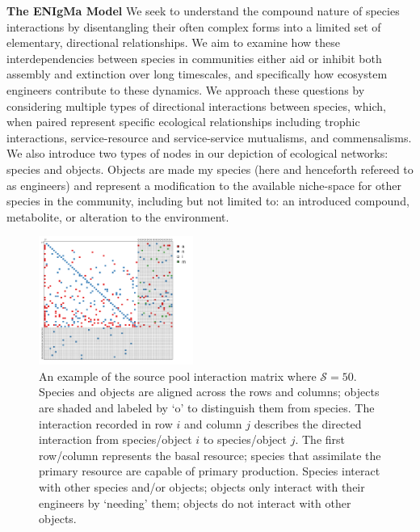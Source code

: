 \documentclass[twocolumn,preprintnumbers,amsmath,amssymb,superscriptaddress]{revtex4}
\begin{document}
\textbf{The ENIgMa Model} We seek to understand the compound nature of species interactions by disentangling their often complex forms into a limited set of elementary, directional relationships.
We aim to examine how these interdependencies between species in communities either aid or inhibit both assembly and extinction over long timescales, and specifically how ecosystem engineers contribute to these dynamics.
We approach these questions by considering multiple types of directional interactions between species, which, when paired represent specific ecological relationships including trophic interactions, service-resource and service-service mutualisms, and commensalisms.
We also introduce two types of nodes in our depiction of ecological networks: species and objects.
Objects are made my species (here and henceforth refereed to as engineers) and represent a modification to the available niche-space for other species in the community, including but not limited to: an introduced compound, metabolite, or alteration to the environment.



\begin{figure}
\centering
\includegraphics[width=0.45\textwidth]{matrix.pdf}
\caption{
An example of the source pool interaction matrix where $\mathcal{S} = 50$. Species and objects are aligned across the rows and columns; objects are shaded and labeled by `o' to distinguish them from species. The interaction recorded in row $i$ and column $j$ describes the directed interaction from species/object $i$ to species/object $j$. The first row/column represents the basal resource; species that assimilate the primary resource are capable of primary production. Species interact with other species and/or objects; objects only interact with their engineers by `needing' them; objects do not interact with other objects.
}
\label{fig:matrix}
\end{figure} 
\end{document}
